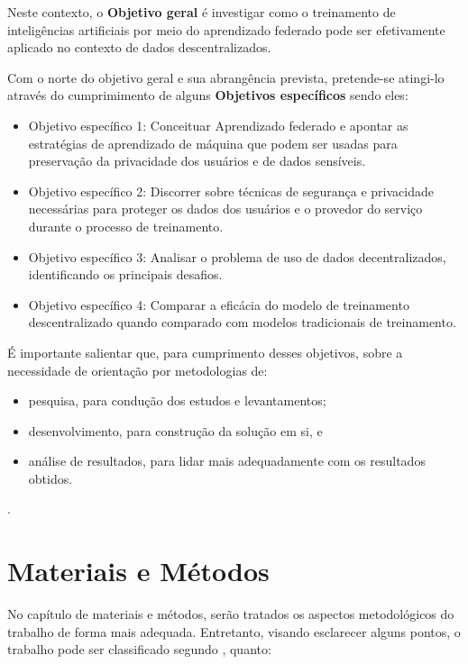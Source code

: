 Neste contexto, o \textbf{Objetivo geral} é investigar como o treinamento de inteligências artificiais por meio do aprendizado federado pode ser efetivamente aplicado no contexto de dados descentralizados. 

Com o norte do objetivo geral e sua abrangência prevista, pretende-se atingi-lo através do cumprimimento de alguns \textbf{Objetivos específicos} sendo eles: 

\begin{itemize}
    \item Objetivo específico 1: Conceituar Aprendizado federado e apontar as estratégias de aprendizado de máquina que podem ser usadas para preservação da privacidade dos usuários e de dados sensíveis.
    \item Objetivo específico 2: Discorrer sobre técnicas de segurança e privacidade necessárias para proteger os dados dos usuários e o provedor do serviço durante o processo de treinamento.
    \item Objetivo específico 3: Analisar o problema de uso de dados decentralizados, identificando os principais desafios.
    \item Objetivo específico 4: Comparar a eficácia do modelo de treinamento descentralizado quando comparado com modelos tradicionais de treinamento.
\end{itemize}

É importante salientar que, para cumprimento desses objetivos, sobre a necessidade de orientação por metodologias de:
\begin{itemize}
    \item pesquisa, para condução dos estudos e levantamentos;
    \item desenvolvimento, para construção da solução em si, e
    \item análise de resultados, para lidar mais adequadamente com os resultados obtidos.
\end{itemize}
.

\section{Materiais e Métodos}
\label{sec:metodologia}

No capítulo de materiais e métodos, serão tratados os aspectos metodológicos do trabalho de forma mais adequada. Entretanto, visando esclarecer alguns pontos, o trabalho pode ser classificado segundo \cite{GIL}, quanto:

